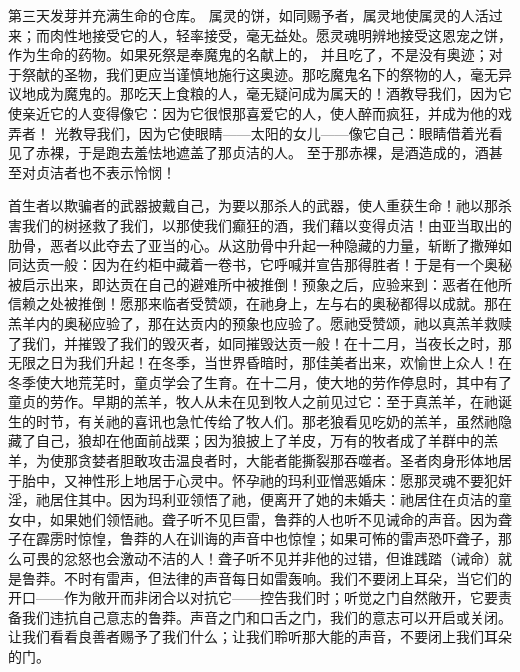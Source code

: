 第三天发芽并充满生命的仓库。 属灵的饼，如同赐予者，属灵地使属灵的人活过来；而肉性地接受它的人，轻率接受，毫无益处。愿灵魂明辨地接受这恩宠之饼，作为生命的药物。\newline{}如果死祭是奉魔鬼的名献上的， 并且吃了，不是没有奥迹；对于祭献的圣物，我们更应当谨慎地施行这奥迹。那吃魔鬼名下的祭物的人，毫无异议地成为魔鬼的。那吃天上食粮的人，毫无疑问成为属天的！酒教导我们，因为它使亲近它的人变得像它：因为它很恨那喜爱它的人，使人醉而疯狂，并成为他的戏弄者！ 光教导我们，因为它使眼睛——太阳的女儿——像它自己：眼睛借着光看见了赤裸，于是跑去羞怯地遮盖了那贞洁的人。 至于那赤裸，是酒造成的，酒甚至对贞洁者也不表示怜悯！\par

首生者以欺骗者的武器披戴自己，为要以那杀人的武器，使人重获生命！祂以那杀害我们的树拯救了我们，以那使我们癫狂的酒，我们藉以变得贞洁！由亚当取出的肋骨，恶者以此夺去了亚当的心。从这肋骨中升起一种隐藏的力量，斩断了撒殚如同达贡一般：因为在约柜中藏着一卷书，它呼喊并宣告那得胜者！于是有一个奥秘被启示出来，即达贡在自己的避难所中被推倒！预象之后，应验来到：恶者在他所信赖之处被推倒！愿那来临者受赞颂，在祂身上，左与右的奥秘都得以成就。那在羔羊内的奥秘应验了，那在达贡内的预象也应验了。愿祂受赞颂，祂以真羔羊救赎了我们，并摧毁了我们的毁灭者，如同摧毁达贡一般！在十二月，当夜长之时，那无限之日为我们升起！在冬季，当世界昏暗时，那佳美者出来，欢愉世上众人！在冬季使大地荒芜时，童贞学会了生育。在十二月，使大地的劳作停息时，其中有了童贞的劳作。早期的羔羊，牧人从未在见到牧人之前见过它：至于真羔羊，在祂诞生的时节，有关祂的喜讯也急忙传给了牧人们。那老狼看见吃奶的羔羊，虽然祂隐藏了自己，狼却在他面前战栗；因为狼披上了羊皮，万有的牧者成了羊群中的羔羊，为使那贪婪者胆敢攻击温良者时，大能者能撕裂那吞噬者。圣者肉身形体地居于胎中，又神性形上地居于心灵中。怀孕祂的玛利亚憎恶婚床：愿那灵魂不要犯奸淫，祂居住其中。因为玛利亚领悟了祂，便离开了她的未婚夫：祂居住在贞洁的童女中，如果她们领悟祂。聋子听不见巨雷，鲁莽的人也听不见诫命的声音。因为聋子在霹雳时惊惶，鲁莽的人在训诲的声音中也惊惶；如果可怖的雷声恐吓聋子，那么可畏的忿怒也会激动不洁的人！聋子听不见并非他的过错，但谁践踏（诫命）就是鲁莽。不时有雷声，但法律的声音每日如雷轰响。我们不要闭上耳朵，当它们的开口——作为敞开而非闭合以对抗它——控告我们时；听觉之门自然敞开，它要责备我们违抗自己意志的鲁莽。声音之门和口舌之门，我们的意志可以开启或关闭。让我们看看良善者赐予了我们什么；让我们聆听那大能的声音，不要闭上我们耳朵的门。\par

